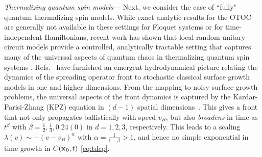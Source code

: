 \documentclass[aps,prl,reprint,superscriptaddress, longbibliography]{revtex4-1}
\newcommand{\vb}{v_B}
\begin{document}
\emph{Thermalizing quantum spin models---}  Next, we consider the case of ``fully" quantum thermalizing spin models. 
While exact analytic results for the OTOC are generally not available in these settings for Floquet systems or for time-independent Hamiltonians, recent work has shown that local random unitary circuit models provide a controlled, analytically tractable setting that captures many of the universal aspects of quantum chaos in thermalizing quantum spin systems \cite{nahum2017quantum, opspreadAdam, opspreadCurt, TiborCons, KhemaniCons}.  Refs.~\cite{opspreadAdam, opspreadCurt, TiborCons, KhemaniCons}  have furnished an emergent hydrodynamical picture relating the dynamics of the spreading operator front to stochastic classical surface growth models in one and higher dimensions. From the mapping to noisy surface growth problems, the universal aspects of the front dynamics is captured by the Kardar-Parisi-Zhang (KPZ) equation in $(d-1)$ spatial dimensions~\cite{opspreadAdam}. This gives a front that not only propagates ballistically with speed $\vb$, but also \emph{broadens} in time as $t^\beta$ with $\beta = \frac{1}{2}, \frac{1}{3},  0.24(0)$ in $d=1,2,3$, respectively. This leads to a scaling $\lambda(v)\sim -(v-\vb)^{\alpha}$ with $\alpha=\frac{1}{1-\beta} >1$, and hence no simple exponential in time growth in $C({\bf x_0},t)$ \eqref{eq:tdep}.  
\end{document}
